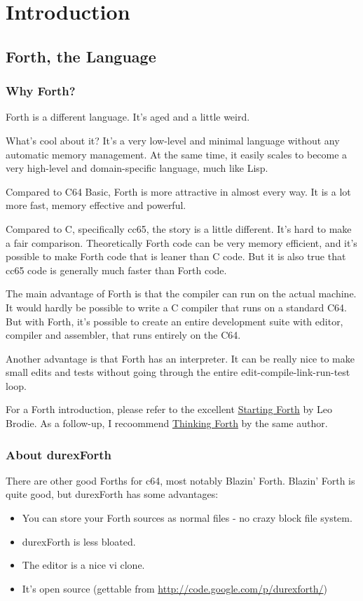 \chapter{Introduction}

\section{Forth, the Language}

\subsection{Why Forth?}

Forth is a different language. It's aged and a little weird.

What's cool about it? It's a very low-level and minimal language without any automatic memory management. At the same time, it easily scales to become a very high-level and domain-specific language, much like Lisp. 

Compared to C64 Basic, Forth is more attractive in almost every way. It is a lot more fast, memory effective and powerful.

Compared to C, specifically cc65, the story is a little different. It's hard to make a fair comparison. Theoretically Forth code can be very memory efficient, and it's possible to make Forth code that is leaner than C code. But it is also true that cc65 code is generally much faster than Forth code.

The main advantage of Forth is that the compiler can run on the actual machine. It would hardly be possible to write a C compiler that runs on a standard C64. But with Forth, it's possible to create an entire development suite with editor, compiler and assembler, that runs entirely on the C64.

Another advantage is that Forth has an interpreter. It can be really nice to make small edits and tests without going through the entire edit-compile-link-run-test loop.

For a Forth introduction, please refer to the excellent \href{http://www.forth.com/starting-forth/}{Starting Forth} by Leo Brodie. As a follow-up, I recoommend \href{http://thinking-forth.sourceforge.net/}{Thinking Forth} by the same author.

\subsection{About durexForth}

There are other good Forths for c64, most notably Blazin' Forth. Blazin' Forth is quite good, but durexForth has some advantages:

\begin{itemize}
\item You can store your Forth sources as normal files - no crazy block file system.
\item durexForth is less bloated.
\item The editor is a nice vi clone.
\item It's open source (gettable from \url{http://code.google.com/p/durexforth/})
\end{itemize}

